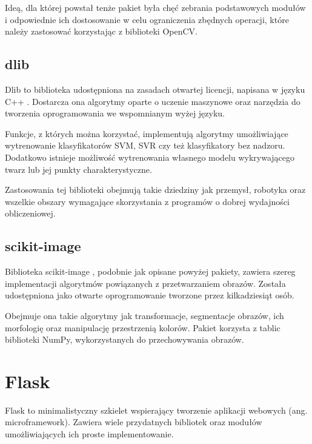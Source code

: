 Ideą, dla której powstał tenże pakiet była chęć zebrania podstawowych modułów i odpowiednie ich dostosowanie w celu ograniczenia zbędnych operacji, które należy zastosować korzystając z biblioteki OpenCV.


\subsection{dlib}
Dlib to biblioteka udostępniona na zasadach otwartej licencji, napisana w języku C++ \cite{dlib}. Dostarcza ona algorytmy oparte o uczenie maszynowe oraz narzędzia do tworzenia oprogramowania we wspomnianym wyżej języku. 

Funkcje, z których można korzystać, implementują algorytmy umożliwiające wytrenowanie klasyfikatorów SVM, SVR czy też klasyfikatory bez nadzoru. Dodatkowo istnieje możliwość wytrenowania własnego modelu wykrywającego twarz lub jej punkty charakterystyczne.

Zastosowania tej biblioteki obejmują takie dziedziny jak przemysł, robotyka oraz wszelkie obszary wymagające skorzystania z programów o dobrej wydajności obliczeniowej.


\subsection{scikit-image}
Biblioteka scikit-image \cite{skimage}, podobnie jak opisane powyżej pakiety, zawiera szereg implementacji algorytmów powiązanych z przetwarzaniem obrazów. Została udostępniona jako otwarte oprogramowanie tworzone przez kilkadziesiąt osób. 

Obejmuje ona takie algorytmy jak transformacje, segmentacje obrazów, ich morfologię oraz manipulację przestrzenią kolorów. Pakiet korzysta z tablic biblioteki NumPy, wykorzystanych do przechowywania obrazów.


\section{Flask}
Flask \cite{flask} to minimalistyczny szkielet wspierający tworzenie aplikacji webowych (ang. microframework). Zawiera wiele przydatnych bibliotek oraz modułów umożliwiających ich proste implementowanie.

